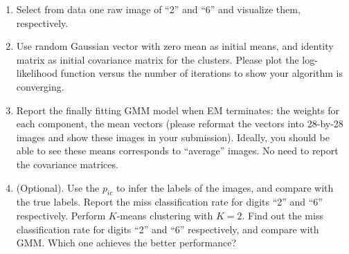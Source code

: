 \documentclass[twoside,10pt]{article}
\begin{document}
\begin{enumerate}
\begin{enumerate}

\item Select from data one raw image of ``2'' and ``6'' and visualize them, respectively. 

\item Use random Gaussian vector with zero mean as initial means, and identity matrix as initial covariance matrix for the clusters. Please plot the log-likelihood function versus the number of iterations to show your algorithm is converging.

\item  Report the finally fitting GMM model when EM terminates: the weights for each component, the mean vectors (please reformat the vectors into 28-by-28 images and show these images in your submission). Ideally, you should be able to see these means corresponds to ``average'' images.  No need to report the covariance matrices. 

\item (Optional). Use the $p_{ic}$ to infer the labels of the images, and compare with the true labels. Report the miss classification rate for digits ``2'' and ``6'' respectively. Perform $K$-means clustering with $K=2$. Find out the  miss classification rate for digits ``2'' and ``6'' respectively, and compare with GMM. Which one achieves the better performance?


\end{enumerate}

\end{enumerate}
\end{document}
